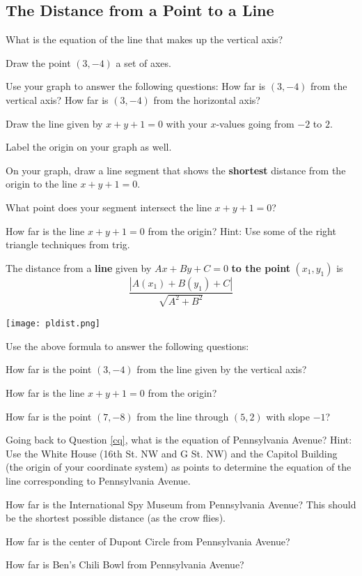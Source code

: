 \subsection{The Distance from a Point to a Line}
\bq
\be
\item What is the equation of the line that makes up the vertical axis?
\item Draw the point $(3,-4)$ a set of axes.
\item Use your graph to answer the following questions:
\subitem How far is $(3,-4)$ from the vertical axis?
\subitem How far is $(3,-4)$ from the horizontal axis?
\ee
\eq

\bq
\be
\item Draw the line given by $x+y+1=0$ with your $x$-values going from $-2$ to $2$.
\item Label the origin on your graph as well.
\item On your graph, draw a line segment that shows the \textbf{shortest} distance from the origin to the line $x+y+1=0$.
\item What point does your segment intersect the line $x+y+1=0$?
\item How far is the line $x+y+1=0$ from the origin? Hint: Use some of the right triangle techniques from trig.
\ee
\eq

\begin{info}
The distance from a \textbf{line} given by $Ax+By+C=0$ \textbf{to the point} $(x_1,y_1)$ is $$\frac{|A(x_1)+B(y_1)+C|}{\sqrt{A^2+B^2}}$$

\begin{center} \texttt{[image: pldist.png]} \end{center}
\end{info}

\bq Use the above formula to answer the following questions:
\be
\item How far is the point $(3,-4)$ from the line given by the vertical axis?
\item How far is the line $x+y+1=0$ from the origin?
\item How far is the point $(7,-8)$ from the line through $(5,2)$ with slope $-1$?
\ee
\eq

\bq \be
\item Going back to Question \ref{cq}, what is the equation of Pennsylvania Avenue?  Hint: Use the White House (16th St. NW and G St. NW) and the Capitol Building (the origin of your coordinate system) as points to determine the equation of the line corresponding to Pennsylvania Avenue.
\item How far is the International Spy Museum from Pennsylvania Avenue? This should be the shortest possible distance (as the crow flies).
\item How far is the center of Dupont Circle from Pennsylvania Avenue?
\item How far is Ben's Chili Bowl from Pennsylvania Avenue?
\ee
\eq

